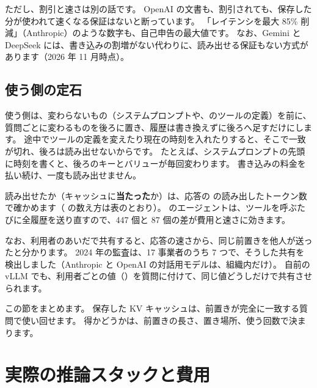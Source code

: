 ただし、割引と速さは別の話です。
OpenAI の文書も、割引されても、保存した分が使われて速くなる保証はないと断っています。
「レイテンシを最大 85\% 削減」（Anthropic）のような数字も、自己申告の最大値です。
なお、Gemini と DeepSeek には、書き込みの割増がない代わりに、読み出せる保証もない方式があります（2026 年 11 月時点）。

\subsection*{使う側の定石}

使う側は、変わらないもの（システムプロンプトや、のツールの定義）を前に、質問ごとに変わるものを後ろに置き、履歴は書き換えずに後ろへ足すだけにします。
途中でツールの定義を変えたり現在の時刻を入れたりすると、そこで一致が切れ、後ろは読み出せないからです。
たとえば、システムプロンプトの先頭に時刻を書くと、後ろのキーとバリューが毎回変わります。
書き込みの料金を払い続け、一度も読み出せません。

読み出せたか（キャッシュに\textbf{当たった}か）は、応答の  の読み出したトークン数で確かめます（ の数え方は表のとおり）。
のエージェントは、ツールを呼ぶたびに全履歴を送り直すので、447 個と 87 個の差が費用と速さに効きます。

なお、利用者のあいだで共有すると、応答の速さから、同じ前置きを他人が送ったと分かります。
2024 年の監査\cite{gu2025auditing}は、17 事業者のうち 7 つで、そうした共有を検出しました（Anthropic と OpenAI の対話用モデルは、組織内だけ）。
自前の vLLM でも、利用者ごとの値（）を質問に付けて、同じ値どうしだけで共有させられます\cite{vllm2026apc}。

この節をまとめます。
保存した KV キャッシュは、前置きが完全に一致する質問で使い回せます。
得かどうかは、前置きの長さ、置き場所、使う回数で決まります。

\section{実際の推論スタックと費用}\label{sec:es-stack}

